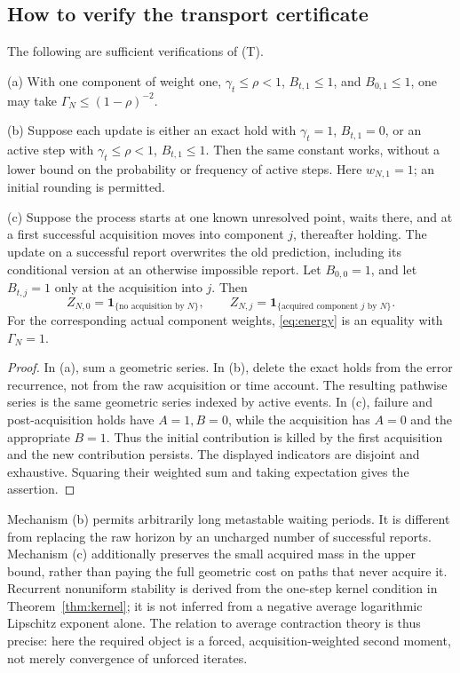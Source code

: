 \subsection{How to verify the transport certificate}
\begin{proposition}\label{prop:mechanisms}
The following are sufficient verifications of \textup{(T)}.

\textup{(a)} With one component of weight one, $\gamma_t\le\rho<1$, $B_{t,1}\le1$, and $B_{0,1}\le1$, one may take $\Gamma_N\le(1-\rho)^{-2}$.

\textup{(b)} Suppose each update is either an exact hold with $\gamma_t=1$, $B_{t,1}=0$, or an active step with $\gamma_t\le\rho<1$, $B_{t,1}\le1$. Then the same constant works, without a lower bound on the probability or frequency of active steps. Here $w_{N,1}=1$; an initial rounding is permitted.

\textup{(c)} Suppose the process starts at one known unresolved point, waits there, and at a first successful acquisition moves into component $j$, thereafter holding. The update on a successful report overwrites the old prediction, including its conditional version at an otherwise impossible report. Let $B_{0,0}=1$, and let $B_{t,j}=1$ only at the acquisition into $j$. Then
\[
 Z_{N,0}=\mathbf1_{\{\text{no acquisition by }N\}},\qquad
 Z_{N,j}=\mathbf1_{\{\text{acquired component }j\text{ by }N\}}.
\]
For the corresponding actual component weights, \eqref{eq:energy} is an equality with $\Gamma_N=1$.
\end{proposition}
\begin{proof}
In (a), sum a geometric series. In (b), delete the exact holds from the error recurrence, not from the raw acquisition or time account. The resulting pathwise series is the same geometric series indexed by active events. In (c), failure and post-acquisition holds have $A=1,B=0$, while the acquisition has $A=0$ and the appropriate $B=1$. Thus the initial contribution is killed by the first acquisition and the new contribution persists. The displayed indicators are disjoint and exhaustive. Squaring their weighted sum and taking expectation gives the assertion.
\end{proof}

Mechanism (b) permits arbitrarily long metastable waiting periods. It is different from replacing the raw horizon by an uncharged number of successful reports. Mechanism (c) additionally preserves the small acquired mass in the upper bound, rather than paying the full geometric cost on paths that never acquire it. Recurrent nonuniform stability is derived from the one-step kernel condition in Theorem~\ref{thm:kernel}; it is not inferred from a negative average logarithmic Lipschitz exponent alone. The relation to average contraction theory \cite{diaconis} is thus precise: here the required object is a forced, acquisition-weighted second moment, not merely convergence of unforced iterates.


